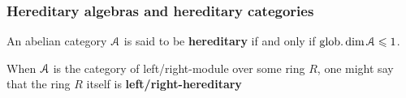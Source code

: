         \subsubsection{Hereditary algebras and hereditary categories}
            \begin{definition} \label{def: hereditary_abelian_categories}
                An abelian category $\mathcal{A}$ is said to be \textbf{hereditary} if and only if $\operatorname{glob.dim} \mathcal{A} \leqslant 1$.
            \end{definition}
            \begin{convention} \label{conv: left/right_hereditary_rings}
                When $\mathcal{A}$ is the category of left/right-module over some ring $R$, one might say that the ring $R$ itself is \textbf{left/right-hereditary}
            \end{convention}
            
